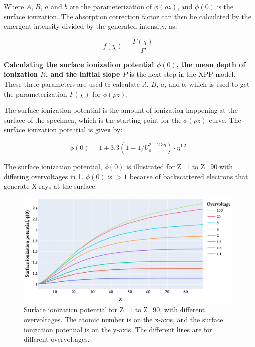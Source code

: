 Where $A$, $B$, $a$ and $b$ are the parameterization of $\phi(\rho z)$, and $\phi(0)$ is the surface ionization.
The absorption correction factor can then be calculated by the emergent intensity divided by the generated intensity, as:

\begin{equation}
    \label{eq:theory:quantitative:pap:absorption_correction}
    f(\chi) = \frac{F(\chi)}{F}
\end{equation}




\textbf{Calculating the surface ionization potential $\phi(0)$, the mean depth of ionization $\bar{R}$, and the initial slope $P$} is the next step in the XPP model.
These three parameters are used to calculate $A$, $B$, $a$, and $b$, which is used to get the parameterization $F(\chi)$ for $\phi(\rho z)$.


The surface ionization potential is the amount of ionization happening at the surface of the specimen, which is the starting point for the $\phi(\rho z)$ curve. The surface ionization potential is given by:

\begin{equation}
    \label{eq:theory:quantitative:pap:phi_0}
    \phi(0) = 1 + 3.3 (1-1/U_0^{2 - 2.3 \bar{\eta}}) \cdot \bar{\eta}^{1.2}
\end{equation}


The surface ionization potential, $\phi(0)$ is illustrated for Z=$1$ to Z=$90$ with differing overvoltages in \cref{fig:pap:phi_0}. 
$\phi(0)$ is $>1$ because of backscattered electrons that generate X-rays at the surface.


\begin{figure}[htbp]
    \centering
    \includegraphics[width=0.8\linewidth]{figures/PAP_surface_ionization_potential.pdf}
    \caption{
        Surface ionization potential for Z=$1$ to Z=$90$, with different overvoltages.
        The atomic number is on the x-axis, and the surface ionization potential is on the y-axis.
        The different lines are for different overvoltages.
    }
    \label{fig:pap:phi_0}
\end{figure}


